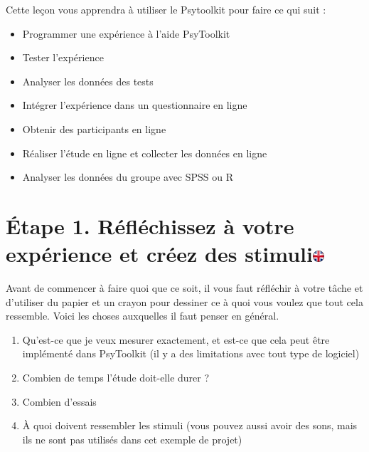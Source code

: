 \documentclass[
]{book}
\providecommand{\tightlist}{%
  \setlength{\itemsep}{0pt}\setlength{\parskip}{0pt}}
\begin{document}
Cette leçon vous apprendra à utiliser le Psytoolkit pour faire ce qui
suit :

\begin{itemize}
\tightlist
\item
  Programmer une expérience à l'aide PsyToolkit
\item
  Tester l'expérience
\item
  Analyser les données des tests
\item
  Intégrer l'expérience dans un questionnaire en ligne
\item
  Obtenir des participants en ligne
\item
  Réaliser l'étude en ligne et collecter les données en ligne
\item
  Analyser les données du groupe avec SPSS ou R
\end{itemize}

\hypertarget{uxe9tape-1.-ruxe9fluxe9chissez-uxe0-votre-expuxe9rience-et-cruxe9ez-des-stimuli}{%
\section[Étape 1. Réfléchissez à votre expérience et créez des
stimuli]{\texorpdfstring{Étape 1. Réfléchissez à votre expérience et
créez des
stimuli\href{https://www.psytoolkit.org/lessons/project.html\#_step_1_think_about_your_experiment_and_create_stimuli}{\protect\includegraphics{img/ukflag.png}}}{Étape 1. Réfléchissez à votre expérience et créez des stimuli}}\label{uxe9tape-1.-ruxe9fluxe9chissez-uxe0-votre-expuxe9rience-et-cruxe9ez-des-stimuli}}

Avant de commencer à faire quoi que ce soit, il vous faut réfléchir à
votre tâche et d'utiliser du papier et un crayon pour dessiner ce à quoi
vous voulez que tout cela ressemble. Voici les choses auxquelles il faut
penser en général.

\begin{enumerate}
\def\labelenumi{\arabic{enumi}.}
\tightlist
\item
  Qu'est-ce que je veux mesurer exactement, et est-ce que cela peut être
  implémenté dans PsyToolkit (il y a des limitations avec tout type de
  logiciel)
\item
  Combien de temps l'étude doit-elle durer ?
\item
  Combien d'essais
\item
  À quoi doivent ressembler les stimuli (vous pouvez aussi avoir des
  sons, mais ils ne sont pas utilisés dans cet exemple de projet)
\end{enumerate}
\end{document}
